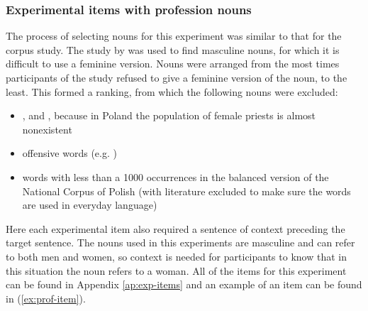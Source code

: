 \subsubsection{Experimental items with profession nouns}
The process of selecting nouns for this experiment was similar to that for the corpus study. The study by \cite{szpyra-kozlowska_premiera_2019} was used to find masculine nouns, for which it is difficult to use a feminine version. Nouns were arranged from the most times participants of the study refused to give a feminine version of the noun, to the least. This formed a ranking, from which the following nouns were excluded:
\begin{itemize}
\item {},  and , because in Poland the population of female priests is almost nonexistent
\item offensive words (e.g. )
\item words with less than a 1000 occurrences in the balanced version of the National Corpus of Polish (with literature excluded to make sure the words are used in everyday language)
\end{itemize}

Here each experimental item also required a sentence of context preceding the target sentence. The nouns used in this experiments are masculine and can refer to both men and women, so context is needed for participants to know that in this situation the noun refers to a woman. All of the items for this experiment can be found in Appendix \ref{ap:exp-items} and an example of an item can be found in (\ref{ex:prof-item}).

